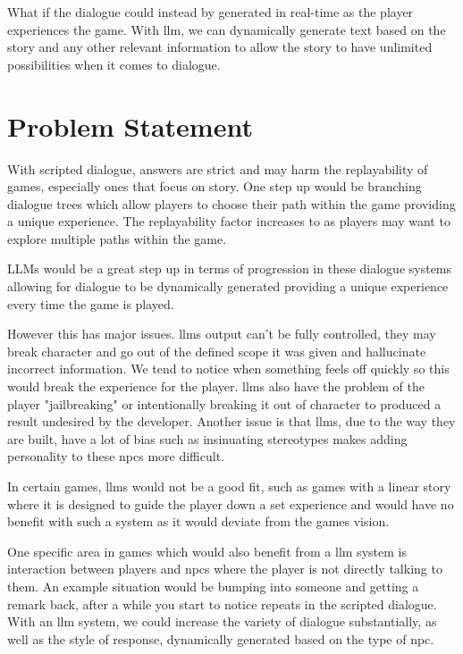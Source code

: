 \documentclass[12pt, a4paper]{report}
\begin{document}
	What if the dialogue could instead by generated in real-time as the player experiences the game. With \gls{llm}, we can dynamically generate text based on the story and any other relevant information to allow the story to have unlimited possibilities when it comes to dialogue.
	
	\section{Problem Statement}
	With scripted dialogue, answers are strict and may harm the replayability of games, especially ones that focus on story. One step up would be branching dialogue trees which allow players to choose their path within the game providing a unique experience. The replayability factor increases to as players may want to explore multiple paths within the game.
	
	LLMs would be a great step up in terms of progression in these dialogue systems allowing for dialogue to be dynamically generated providing a unique experience every time the game is played.
	
	However this has major issues. \gls{llm}s output can't be fully controlled, they may break character and go out of the defined scope it was given and hallucinate incorrect information. We tend to notice when something feels off quickly so this would break the experience for the player. \gls{llm}s also have the problem of the player "jailbreaking" or intentionally breaking it out of character to produced a result undesired by the developer. Another issue is that \gls{llm}s, due to the way they are built, have a lot of bias such as insinuating stereotypes makes adding personality to these \gls{npc}s more difficult.
	
	In certain games, \gls{llm}s would not be a good fit, such as games with a linear story where it is designed to guide the player down a set experience and would have no benefit with such a system as it would deviate from the games vision.
	
	One specific area in games which would also benefit from a \gls{llm} system is interaction between players and \gls{npc}s where the player is not directly talking to them. An example situation would be bumping into someone and getting a remark back, after a while you start to notice repeats in the scripted dialogue. With an \gls{llm} system, we could increase the variety of dialogue substantially, as well as the style of response, dynamically generated based on the type of \gls{npc}.
\end{document}
